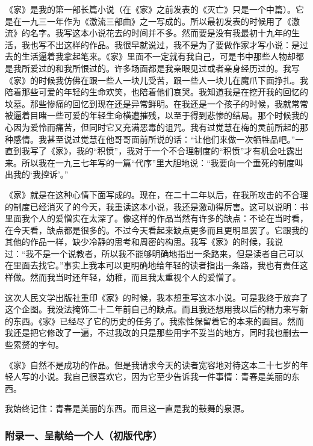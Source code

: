 \par 《家》是我的第一部长篇小说（在《家》之前发表的《灭亡》只是一个中篇）。它是在一九三一年作为《激流三部曲》之一写成的。所以最初发表的时候用了《激流》的名字。我写这本小说花去的时间并不多。然而要是没有我最初十九年的生活，我也写不出这样的作品。我很早就说过，我不是为了要做作家才写小说：是过去的生活逼着我拿起笔来。《家》里面不一定就有我自己，可是书中那些人物却都是我所爱过的和我所恨过的。许多场面都是我亲眼见过或者亲身经历过的。我写《家》的时候我仿佛在跟一些人一块儿受苦，跟一些人一块儿在魔爪下面挣扎。我陪着那些可爱的年轻的生命欢笑，也陪着他们哀哭。我知道我是在挖开我的回忆的坟墓。那些惨痛的回忆到现在还是异常鲜明。在我还是一个孩子的时候，我就常常被逼着目睹一些可爱的年轻生命横遭摧残，以至于得到悲惨的结局。那个时候我的心因为爱怜而痛苦，但同时它又充满恶毒的诅咒。我有过觉慧在梅的灵前所起的那种感情。我甚至说过觉慧在他哥哥面前所说的话：“让他们来做一次牺牲品吧。”一直到我写了《家》，我的“积愤”，我对于一个不合理制度的“积愤”才有机会吐露出来。所以我在一九三七年写的一篇“代序”里大胆地说：“我要向一个垂死的制度叫出我的‘我控诉’。”
\par 《家》就是在这种心情下面写成的。现在，在二十二年以后，在我所攻击的不合理的制度已经消灭了的今天，我重读这本小说，我还是激动得厉害。这可以说明：书里面我个人的爱憎实在太深了。像这样的作品当然有许多的缺点：不论在当时看，在今天看，缺点都是很多的。不过今天看起来缺点更多而且更明显罢了。它跟我的其他的作品一样，缺少冷静的思考和周密的构思。我写《家》的时候，我说过：“我不是一个说教者，所以我不能够明确地指出一条路来，但是读者自己可以在里面去找它。”事实上我本可以更明确地给年轻的读者指出一条路，我也有责任这样做。然而我当时还年轻，幼稚，而且我太重视个人的爱憎了。
\par 这次人民文学出版社重印《家》的时候，我本想重写这本小说。可是我终于放弃了这个企图。我没法掩饰二十二年前自己的缺点。而且我还想用我以后的精力来写新的东西。《家》已经尽了它的历史的任务了。我索性保留着它的本来的面目。然而我还是把它修改了一遍，不过我改的只是那些用字不妥当的地方，同时我也删去一些累赘的字句。
\par 《家》自然不是成功的作品。但是我请求今天的读者宽容地对待这本二十七岁的年轻人写的小说。我自己很喜欢它，因为它至少告诉我一件事情：青春是美丽的东西。
\par 我始终记住：青春是美丽的东西。而且这一直是我的鼓舞的泉源。
\par {}
\par {}



\subsubsection*{附录一、呈献给一个人（初版代序）}


